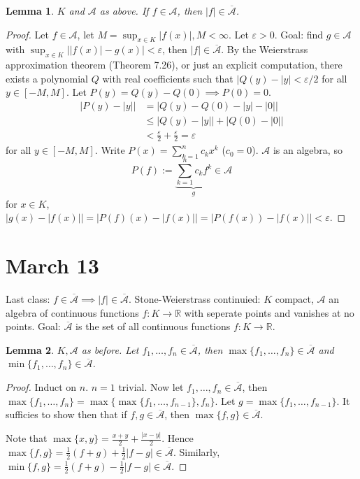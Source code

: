 \documentclass{article}
\theoremstyle{plain}
\newtheorem{lemma}{Lemma}
\theoremstyle{remark}
\newcommand{\R}{{\mathbb R}}
\newcommand{\ep}{{\varepsilon}}
\begin{document}
\begin{lemma}
	$K$ and $\mathcal{A}$ as above.
	If $f \in \mathcal{A}$, then $|f| \in \overline{\mathcal{A}}$.
\end{lemma}
\begin{proof}
	Let $f \in \mathcal{A}$, let $M = \sup_{x \in K} |f(x)|, M < \infty$.
	Let $\ep > 0$. Goal: find $g \in \mathcal{A}$ with $\sup_{x\in K}
	\lvert \lvert f(x) \rvert - g(x) \rvert < \ep$,
	then $|f| \in \overline{\mathcal{A}}$.
	By the Weierstrass approximation theorem (Theorem 7.26),
	or just an explicit computation,
	there exists a polynomial $Q$ with real coefficients such that
	$|Q(y) - |y| < \ep/2$ for all $y \in [-M,M]$.
	Let $P(y) = Q(y) - Q(0) \implies P(0) = 0$.
	\begin{align*}
		\lvert P(y) - \lvert y \rvert \rvert
		&= \lvert Q(y) - Q(0) - \lvert y \rvert - \lvert 0 \rvert \rvert\\
		&\leq \lvert Q(y) - \lvert y \rvert \rvert + \lvert Q(0) - \lvert 0 \rvert \rvert\\
		&< \frac{\ep}{2} + \frac{\ep}{2} = \ep
	\end{align*}
	for all $y \in [-M,M]$.
	Write $P(x) = \sum_{k=1}^n c_k x^k$ ($c_0 = 0$).
	$\mathcal{A}$ is an algebra, so
	\[
		P(f) := \underbrace{\sum_{k=1}^n c_k f^k}_{g} \in \mathcal{A}
	\]
	for $x \in K$, $\lvert g(x) - \lvert f(x) \rvert \rvert
	= \lvert P(f)(x) - \lvert f(x) \rvert \rvert =
	\lvert P(f(x)) - \lvert f(x) \rvert \rvert < \ep$.
\end{proof}


\section{March 13}
Last class: $f \in \overline{\mathcal{A}} \implies |f| \in \overline{\mathcal{A}}$.
Stone-Weierstrass continuied:
$K$ compact, $\mathcal{A}$ an algebra of continuous functions $f \colon K \to \R$
with seperate points and vanishes at no points.
Goal: $\overline{\mathcal{A}}$ is the set of all continuous functions $f \colon K \to \R$.

\begin{lemma}
	$K,\mathcal{A}$ as before.
	Let $f_1,\dots,f_n \in \overline{\mathcal{A}}$, then
	$\max\{f_1,\dots,f_n\} \in \overline{\mathcal{A}}$ and
	$\min\{f_1,\dots,f_n\} \in \overline{\mathcal{A}}$.
\end{lemma}
\begin{proof}
	Induct on $n$. $n = 1$ trivial.
	Now let $f_1,\dots,f_n \in \overline{\mathcal{A}}$,
	then $\max\{f_1,\dots,f_n\} = \max\{ \max\{f_1,\dots,f_{n-1}\},f_n\}$.
	Let $g = \max\{f_1,\dots,f_{n-1}\}$.
	It sufficies to show then that if $f,g \in \overline{\mathcal{A}}$,
	then $\max\{f,g\}\in \overline{\mathcal{A}}$.

	Note that $\max\{x,y\} = \frac{x+y}{2} + \frac{|x-y|}{2}$.
	Hence $\max\{f,g\} = \frac12(f+g) + \frac12|f-g| \in \overline{\mathcal{A}}$.
	Similarly, $\min\{f,g\} = \frac12(f+g) - \frac12|f-g| \in \overline{\mathcal{A}}$.
\end{proof}
\end{document}
